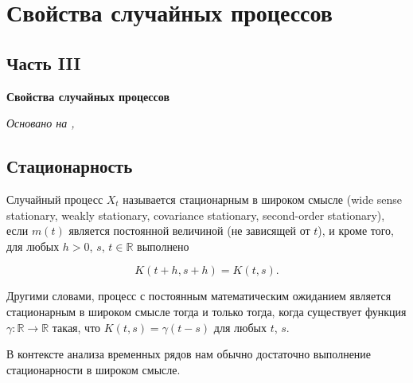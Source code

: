 \chapter{Свойства случайных процессов}
\label{chap:properties}
\section*{Часть III} \textbf{Свойства случайных процессов}

\textit{Основано на \cite{adeshereKorrelyaciyaMezhduVremennymi2021},
\cite{panovTeoriyaSluchaynyhProcessov2018}}

\section{Стационарность}
 {
  Случайный процесс \( X_t \) называется
  стационарным в широком смысле (wide sense stationary,
    weakly stationary, covariance stationary,
  second-order stationary), если $m(t)$ является постоянной величиной
  (не зависящей от $t$), и кроме того, для любых $h > 0$, $s$, $t \in
  \mathbb{R}$ выполнено

\[ K(t + h, s + h) = K(t, s). \] }

Другими словами, процесс с постоянным математическим ожиданием
является стационарным в широком смысле тогда и только тогда, когда
существует функция $ \gamma : \mathbb{R} \to \mathbb{R} $ такая, что $
K(t, s) = \gamma(t-s) $ для любых $t$, $s$.

В контексте анализа временных рядов
нам обычно достаточно выполнение стационарности в широком смысле.

